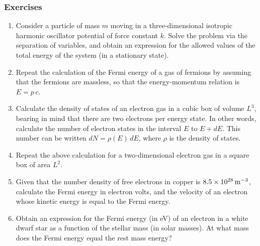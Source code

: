 \subsubsection*{Exercises}
{\small
\begin{enumerate}
\item Consider a particle of mass $m$ moving in a three-dimensional
isotropic harmonic oscillator potential of force constant $k$. Solve the
problem via the separation of variables, and obtain an expression for
the allowed values of the total energy of the system (in a stationary state).
\item Repeat the calculation of the Fermi energy of a gas of fermions by
assuming that the fermions are massless, so that the energy-momentum relation
is $E=p\,c$. 
\item Calculate the density of states of an electron gas in a cubic
box of volume $L^3$, bearing in  mind that there are two electrons
per energy state. In other words, calculate the number of electron
states in the interval $E$ to $E+dE$. This number can be written $dN = \rho(E)\,dE$,
where $\rho$ is the density of states. 
\item Repeat the above calculation for a two-dimensional electron
gas in a square box of area $L^2$.
\item Given that the number density of free electrons in copper is
$8.5\times 10^{28}\,{\rm m}^{-3}$, calculate the Fermi
energy in electron volts, and the velocity of an electron whose kinetic
energy is equal to the Fermi energy. 
\item Obtain an expression for the Fermi energy (in eV) of an electron in a white
dwarf star as a function of the stellar mass (in solar masses). At what
mass does the Fermi energy equal the rest mass energy?
\end{enumerate}
}